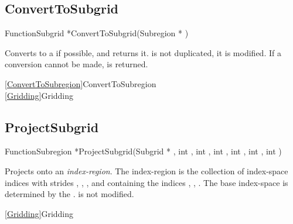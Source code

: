 \newpage
\subsection{ConvertToSubgrid}
\label{ConvertToSubgrid}


\begin{deftypefn}{Function}{Subgrid *}{ConvertToSubgrid}({Subregion *} )

\DESCRIPTION
Converts  to a  if possible,
and returns it.
 is not duplicated, it is modified.
If a conversion cannot be made,  is returned.

\SEEALSO
\vref{ConvertToSubregion}{ConvertToSubregion}\\
\vref{Gridding}{Gridding}

\end{deftypefn}


\newpage
\subsection{ProjectSubgrid}
\label{ProjectSubgrid}


\begin{deftypefn}{Function}{Subregion *}{ProjectSubgrid}({Subgrid *} , int , int , int , int , int , int )

\DESCRIPTION
Projects  onto an {\em index-region}.
The index-region is the collection of index-space indices with
strides , , , and containing
the indices , , .
The base index-space is determined by the .
 is not modified.

\SEEALSO
\vref{Gridding}{Gridding}

\end{deftypefn}


